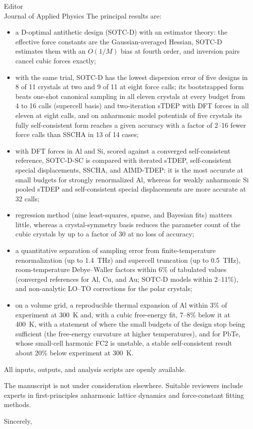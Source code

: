 \documentclass[11pt]{letter}
\begin{document}
\begin{letter}{Editor\\Journal of Applied Physics}
The principal results are:
\begin{itemize}
\item a D-optimal antithetic design (SOTC-D) with an estimator theory: the
effective force constants are the Gaussian-averaged Hessian, SOTC-D estimates
them with an $O(1/M)$ bias at fourth order, and inversion pairs cancel cubic
forces exactly;
\item with the same trial, SOTC-D has the lowest dispersion error of five
designs in 8 of 11 crystals at two and 9 of 11 at eight force calls; its
bootstrapped form beats one-shot canonical sampling in all
eleven crystals at every budget from 4 to 16 calls (supercell basis) and two-iteration sTDEP
with DFT forces in all eleven at eight calls, and on anharmonic
model potentials of five crystals its fully self-consistent form reaches a
given accuracy with a factor of 2--16 fewer force calls than SSCHA in 13 of
14 cases;
\item with DFT forces in Al and Si, scored against a converged
self-consistent reference, SOTC-D-SC is compared with iterated sTDEP,
self-consistent special displacements, SSCHA, and AIMD-TDEP: it is the most
accurate at small budgets for strongly renormalized Al, whereas for weakly
anharmonic Si pooled sTDEP and self-consistent special displacements are
more accurate at 32 calls;
\item regression method (nine least-squares, sparse, and Bayesian fits)
matters little, whereas a crystal-symmetry basis reduces the parameter count
of the cubic crystals by up to a factor of 30 at no loss of accuracy;
\item a quantitative separation of sampling error from finite-temperature
renormalization (up to 1.4~THz) and supercell truncation (up to 0.5~THz),
room-temperature Debye--Waller factors within 6\% of tabulated values
(converged references for Al, Cu, and Au; SOTC-D models within 2--11\%),
and non-analytic LO--TO corrections for the polar crystals;
\item on a volume grid, a reproducible thermal expansion of Al within 3\% of
experiment at 300~K and, with a cubic free-energy fit, 7--8\% below it at 400~K, with a statement of where the small budgets of the
design stop being sufficient (the free-energy curvature at higher
temperatures), and for PbTe, whose small-cell harmonic FC2 is unstable, a
stable self-consistent result about 20\% below experiment at 300~K.
\end{itemize}
All inputs, outputs, and analysis scripts are openly available.

The manuscript is not under consideration elsewhere. Suitable reviewers
include experts in first-principles anharmonic lattice dynamics and
force-constant fitting methods.

\closing{Sincerely,}
\end{letter}
\end{document}
